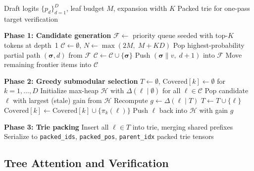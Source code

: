 \begin{algorithm}[t]
\caption{Prefix-Aware Tree Construction}
\label{alg:prefix-aware}
\begin{algorithmic}[1]
\Require Draft logits $\{p_d\}_{d=1}^D$, leaf budget $M$, expansion width $K$
\Ensure Packed trie for one-pass target verification

\Statex \textbf{Phase 1: Candidate generation}
\State $\mathcal{F} \leftarrow$ priority queue seeded with top-$K$ tokens at depth~1
\State $\mathcal{C} \leftarrow \emptyset$, \; $N \leftarrow \max(2M,\; M + KD)$
  \State Pop highest-probability partial path $(\boldsymbol{\sigma}, d)$ from $\mathcal{F}$
    \State $\mathcal{C} \leftarrow \mathcal{C} \cup \{\boldsymbol{\sigma}\}$
  \Else
      \State Push $(\boldsymbol{\sigma} \| v,\; d{+}1)$ into $\mathcal{F}$
    \EndFor
  \EndIf
\EndWhile
\State Move remaining frontier items into $\mathcal{C}$

\Statex \textbf{Phase 2: Greedy submodular selection}
\State $T \leftarrow \emptyset$, \; $\mathrm{Covered}[k] \leftarrow \emptyset$ for $k = 1, \dots, D$
\State Initialize max-heap $\mathcal{H}$ with $\Delta(\ell \mid \emptyset)$ for all $\ell \in \mathcal{C}$
  \State Pop candidate $\ell$ with largest (stale) gain from $\mathcal{H}$
  \State Recompute $g \leftarrow \Delta(\ell \mid T)$
   
    \State $T \leftarrow T \cup \{\ell\}$
      \State $\mathrm{Covered}[k] \leftarrow \mathrm{Covered}[k] \cup \{\pi_k(\ell)\}$
    \EndFor
  \Else
    \State Push $\ell$ back into $\mathcal{H}$ with gain $g$
  \EndIf
\EndWhile

\Statex \textbf{Phase 3: Trie packing}
\State Insert all $\ell \in T$ into trie, merging shared prefixes
\State Serialize to \texttt{packed\_ids}, \texttt{packed\_pos}, \texttt{parent\_idx}
\State \Return packed trie tensors
\end{algorithmic}
\end{algorithm}

\subsection{Tree Attention and Verification}
\label{sec:tree-attention}

